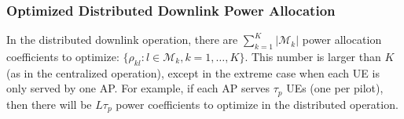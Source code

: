 \enlargethispage{\baselineskip}

\subsubsection{Optimized Distributed Downlink Power Allocation}
\label{sec:optimized-power-allocation-downlink-scheme2}

In the distributed downlink operation, there are $\sum_{k=1}^K |\mathcal{M}_k|$ power allocation coefficients to optimize: $\{\rho_{kl} :  l\in \mathcal{M}_k, k=1,\ldots,K\}$. 
This number is larger than $K$ (as in the centralized operation), except in the extreme case when each UE is only served by one AP. For example, if each AP serves $\tau_p$ UEs (one per pilot), then there will be $L \tau_p$ power coefficients to optimize in the distributed operation.

